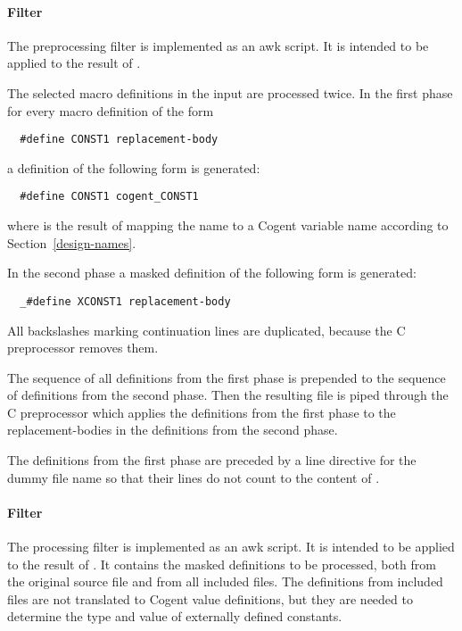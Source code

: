 \paragraph{Filter }

The preprocessing filter is implemented as an awk script. It is intended to be applied to the result
of . 

The selected macro definitions in the input are processed twice. In the first phase for every macro 
definition of the form
\begin{verbatim}
  #define CONST1 replacement-body
\end{verbatim}
a definition of the following form is generated:
\begin{verbatim}
  #define CONST1 cogent_CONST1
\end{verbatim}
where  is the result of mapping the name  to a Cogent variable name
according to Section~\ref{design-names}.

In the second phase a masked definition of the following form is generated:
\begin{verbatim}
  _#define XCONST1 replacement-body
\end{verbatim}
All backslashes marking continuation lines are duplicated, because the C preprocessor removes them.

The sequence of all definitions from the first phase is prepended to the sequence of definitions from the second 
phase. Then the resulting file is piped through the C preprocessor
which applies the definitions from the first phase to the replacement-bodies in the definitions from the
second phase.

The definitions from the first phase are preceded by a line directive for the dummy file name 
so that their lines do not count to the content of .

\paragraph{Filter }

The processing filter is implemented as an awk script. It is intended to be applied to the result of 
. It contains the masked definitions to be processed, both from the original source file
and from all included files. The definitions from included files are not translated to Cogent value
definitions, but they are needed to determine the type and value of externally defined constants.


